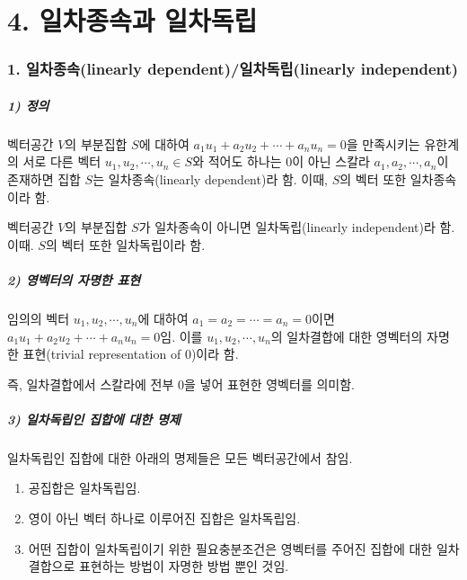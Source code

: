 \part*{4. 일차종속과 일차독립}

\section*{1. 일차종속(linearly dependent)/일차독립(linearly independent)}

\subsubsection*{1) 정의\\}
\begin{DEF}
벡터공간 $V$의 부분집합 $S$에 대하여 $a_1u_1+a_2u_2+ \cdots +a_nu_n=0$을 만족시키는 유한계의 서로 다른 벡터 $u_1,u_2, \cdots ,u_n \in S$와 적어도 하나는 0이 아닌 스칼라 $a_1,a_2, \cdots ,a_n$이 존재하면 집합 $S$는 일차종속(linearly dependent)라 함. 이때, $S$의 벡터 또한 일차종속이라 함.

벡터공간 $V$의 부분집합 $S$가 일차종속이 아니면 일차독립(linearly independent)라 함. 이때. $S$의 벡터 또한 일차독립이라 함.
\end{DEF}

\subsubsection*{2) 영벡터의 자명한 표현}
임의의 벡터 $u_1,u_2, \cdots ,u_n$에 대하여 $a_1=a_2= \cdots =a_n=0$이면 $a_1u_1+a_2u_2+ \cdots +a_nu_n=0$임. 이를 $u_1,u_2, \cdots ,u_n$의 일차결합에 대한 영벡터의 자명한 표현(trivial representation of 0)이라 함.

즉, 일차결합에서 스칼라에 전부 0을 넣어 표현한 영벡터를 의미함.


\subsubsection*{3) 일차독립인 집합에 대한 명제}
일차독립인 집합에 대한 아래의 명제들은 모든 벡터공간에서 참임.

\begin{enumerate}
    \item 공집합은 일차독립임.
    \item 영이 아닌 벡터 하나로 이루어진 집합은 일차독립임.
    \item 어떤 집합이 일차독립이기 위한 필요충분조건은 영벡터를 주어진 집합에 대한 일차결합으로 표현하는 방법이 자명한 방법 뿐인 것임.
\end{enumerate}


